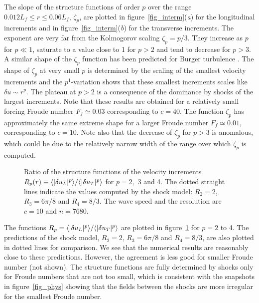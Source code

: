 The slope of the structure functions of order $p$ over the range
$0.012 L_f\leqslant r \leqslant 0.06 L_f$, $\zeta_p$, are plotted in
figure~\ref{fig_interm}(\textit{a}) for the longitudinal increments
and in figure~\ref{fig_interm}(\textit{b}) for the transverse
increments.
%
The exponent are very far from the Kolmogorov scaling $\zeta_p = p/3$.
They increase as $p$ for $p\ll1$, saturate to a value close to 1 for
$p>2$ and tend to decrease for $p>3$.
%
A similar shape of the $\zeta_p$ function has been predicted for
Burger turbulence \cite[]{BouchaudMezardParisi1995}.
%
The shape of $\zeta_p$ at very small $p$ is determined by the
scaling of the smallest velocity increments and the $p^1$-variation
shows that these smallest increments scales like $\delta u \sim r^p$.
%
The plateau at $p > 2$ is a consequence of the dominance by shocks of
the largest increments.
%
Note that these results are obtained for a relatively small forcing
Froude number $F_f \simeq 0.03$ corresponding to $c=40$.  The function
$\zeta_p$ has approximately the same extreme shape for a larger Froude
number $F_f \simeq 0.01$, corresponding to $c=10$.  Note also that the
decrease of $\zeta_p$ for $p>3$ is anomalous, which could be due to
the relatively narrow width of the range over which $\zeta_p$ is
computed.



\begin{figure}
\caption{
Ratio of the structure functions of the velocity increments 
$R_p(r) \equiv \langle |\delta u_L|^p \rangle / \langle |\delta u_T|^p \rangle$
for $p = 2,$ 3 and 4.
The dotted straight lines indicate the values computed by the shock model:
$R_2 = 2$, $R_3 = 6\pi/8$ and $R_4 = 8/3$.
%
The wave speed and the resolution are $c = 10$ and $n = 7680$.  }
\label{fig_ratio}
\end{figure}


The functions $R_p = \langle |\delta u_L|^p \rangle/\langle |\delta u_T|^p \rangle$ are
plotted in figure~\ref{fig_ratio} for $p =2$ to 4.  The predictions of
the shock model, $R_2 = 2$, $R_3 = 6\pi/8$ and $R_4 = 8/3$, are also
plotted in dotted lines for comparison.  We see that the numerical
results are reasonably close to these predictions.  However, the
agreement is less good for smaller Froude number (not shown).  The
structure functions are fully determined by shocks only for Froude
numbers that are not too small, which is consistent with the snapshots
in figure~\ref{fig_phys} showing that the fields between the shocks
are more irregular for the smallest Froude number.


